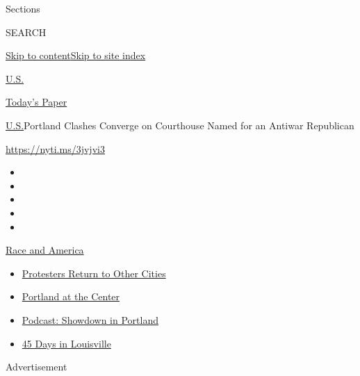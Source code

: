Sections

SEARCH

\protect\hyperlink{site-content}{Skip to
content}\protect\hyperlink{site-index}{Skip to site index}

\href{https://www.nytimes.com/section/us}{U.S.}

\href{https://myaccount.nytimes.com/auth/login?response_type=cookie\&client_id=vi}{}

\href{https://www.nytimes.com/section/todayspaper}{Today's Paper}

\href{/section/us}{U.S.}\textbar{}Portland Clashes Converge on
Courthouse Named for an Antiwar Republican

\url{https://nyti.ms/3jvjvi3}

\begin{itemize}
\item
\item
\item
\item
\item
\end{itemize}

\href{https://www.nytimes.com/news-event/george-floyd-protests-minneapolis-new-york-los-angeles?action=click\&pgtype=Article\&state=default\&region=TOP_BANNER\&context=storylines_menu}{Race
and America}

\begin{itemize}
\tightlist
\item
  \href{https://www.nytimes.com/2020/07/26/us/protests-portland-seattle-trump.html?action=click\&pgtype=Article\&state=default\&region=TOP_BANNER\&context=storylines_menu}{Protesters
  Return to Other Cities}
\item
  \href{https://www.nytimes.com/2020/07/24/us/portland-oregon-protests-white-race.html?action=click\&pgtype=Article\&state=default\&region=TOP_BANNER\&context=storylines_menu}{Portland
  at the Center}
\item
  \href{https://www.nytimes.com/2020/07/23/podcasts/the-daily/portland-protests.html?action=click\&pgtype=Article\&state=default\&region=TOP_BANNER\&context=storylines_menu}{Podcast:
  Showdown in Portland}
\item
  \href{https://www.nytimes.com/interactive/2020/07/16/us/black-lives-matter-protests-louisville-breonna-taylor.html?action=click\&pgtype=Article\&state=default\&region=TOP_BANNER\&context=storylines_menu}{45
  Days in Louisville}
\end{itemize}

Advertisement

